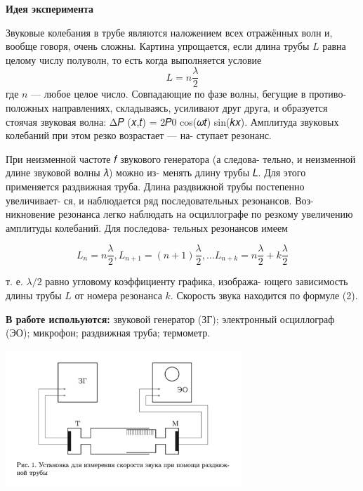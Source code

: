 \documentclass[12pt]{article}
\begin{document}
    \textbf{Идея эксперимента}

    Звуковые колебания в трубе являются наложением всех отражённых волн и, вообще говоря, очень сложны. Картина упрощается, если длина трубы $𝐿$ равна целому числу полуволн, то есть когда выполняется условие
    \begin{equation}
        L = n\frac{\lambda}{2}
    \end{equation}
    где $n$ — любое целое число. Совпадающие по фазе волны, бегущие в противо- положных направлениях, складываясь, усиливают друг друга, и образуется стоячая звуковая волна:
    Δ𝑃 (𝑥,𝑡) = 2𝑃0 cos(𝜔𝑡) sin(𝑘𝑥).
    Амплитуда звуковых колебаний при этом резко возрастает — на- ступает резонанс.

    При неизменной частоте 𝑓 звукового генератора (а следова- тельно, и неизменной длине звуковой волны 𝜆) можно из- менять длину трубы 𝐿. Для этого применяется раздвижная труба. Длина раздвижной трубы постепенно увеличивает- ся, и наблюдается ряд последовательных резонансов. Воз- никновение резонанса легко наблюдать на осциллографе по резкому увеличению амплитуды колебаний. Для последова- тельных резонансов имеем

    \begin{equation}
        L_n = n\frac{\lambda}{2}, L_{n+1} = (n+1)\frac{\lambda}{2}, \dots L_{n+k} = n\frac{\lambda}{2} + k\frac{\lambda}{2}
    \end{equation}
    
    т. е. $\lambda/2$ равно угловому коэффициенту графика, изобража- ющего зависимость длины трубы $L$ от номера резонанса $k$. Скорость звука находится по формуле (2).

    \textbf{В работе испольуются:} звуковой генератор (ЗГ); электронный осциллограф (ЭО); микрофон; раздвижная труба; термометр.

    \begin{center} 
    \includegraphics[width=3.5in]{stand.png}
    \end{center}
\end{document}
